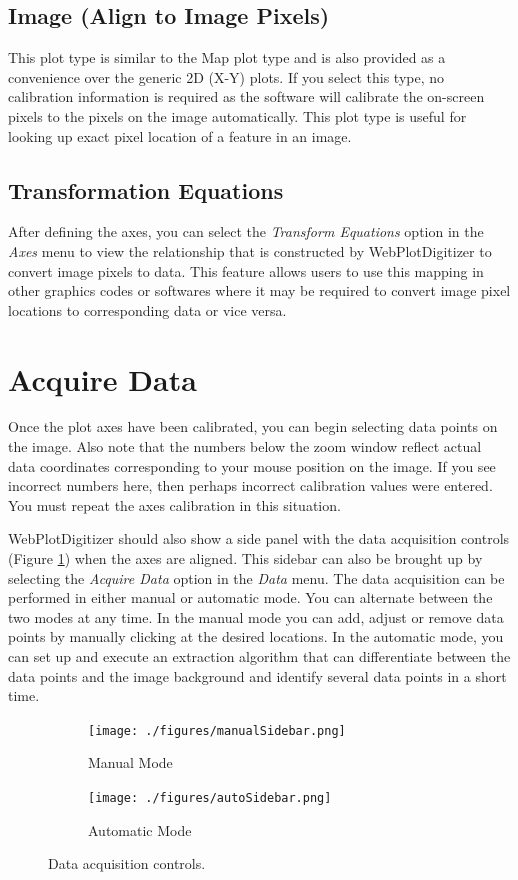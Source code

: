\documentclass[letterpaper, 10pt]{article}
\begin{document}
\subsection{Image (Align to Image Pixels)}
This plot type is similar to the Map plot type and is also provided as a convenience over the generic 2D (X-Y) plots. If you select this type, no calibration information is required as the software will calibrate the on-screen pixels to the pixels on the image automatically. This plot type is useful for looking up exact pixel location of a feature in an image.

\subsection{Transformation Equations}
After defining the axes, you can select the \emph{Transform Equations} option in the \emph{Axes} menu to view the relationship that is constructed by WebPlotDigitizer to convert image pixels to data. This feature allows users to use this mapping in other graphics codes or softwares where it may be required to convert image pixel locations to corresponding data or vice versa.

\section{Acquire Data}

Once the plot axes have been calibrated, you can begin selecting data points on the image. Also note that the numbers below the zoom window reflect actual data coordinates corresponding to your mouse position on the image. If you see incorrect numbers here, then perhaps incorrect calibration values were entered. You must repeat the axes calibration in this situation. 

WebPlotDigitizer should also show a side panel with the data acquisition controls (Figure \ref{fig:acquireData}) when the axes are aligned. This sidebar can also be brought up by selecting the \emph{Acquire Data} option in the \emph{Data} menu. The data acquisition can be performed in either manual or automatic mode. You can alternate between the two modes at any time. In the manual mode you can add, adjust or remove data points by manually clicking at the desired locations. In the automatic mode, you can set up and execute an extraction algorithm that can differentiate between the data points and the image background and identify several data points in a short time.

\begin{figure}
\centering
{
\begin{subfigure}{0.3\textwidth}
\texttt{[image: ./figures/manualSidebar.png]}
\caption{Manual Mode}
\end{subfigure}
\begin{subfigure}{0.3\textwidth}
\texttt{[image: ./figures/autoSidebar.png]}
\caption{Automatic Mode}
\end{subfigure}
}
\caption{Data acquisition controls.}
\label{fig:acquireData}
\end{figure}
\end{document}
